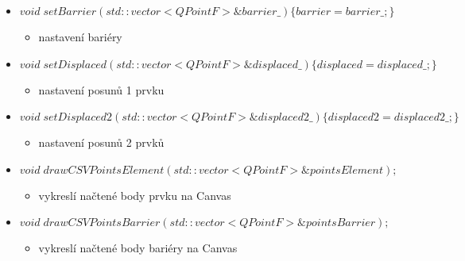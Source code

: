 \documentclass[oneside,12pt,a4paper]{book}
\begin{document}
\begin{itemize}
    \item $void\; setBarrier(std::vector<QPointF> \&barrier\_)\{barrier=barrier\_;\}$
    \begin{itemize}
    \item  nastavení bariéry
    \end{itemize}

    \item $void\; setDisplaced(std::vector<QPointF> \&displaced\_)\{displaced=displaced\_;\}$
    \begin{itemize}
    \item  nastavení posunů 1 prvku
    \end{itemize}

    \item $void\; setDisplaced2(std::vector<QPointF> \&displaced2\_)\{displaced2 = displaced2\_;\}$
    \begin{itemize}
    \item  nastavení posunů 2 prvků
    \end{itemize}
    
    \item $void\; drawCSVPointsElement(std::vector<QPointF> \&pointsElement);$
    \begin{itemize}
    \item  vykreslí načtené body prvku na Canvas
    \end{itemize}

    \item $void\; drawCSVPointsBarrier(std::vector<QPointF> \&pointsBarrier);$
    \begin{itemize}
    \item  vykreslí načtené body bariéry na Canvas
    \end{itemize}

  \begin{comment} %
    \begin{itemize}
    \end{itemize}

    \begin{itemize}
    \end{itemize}


\end{comment}
\end{itemize}
\end{document}
